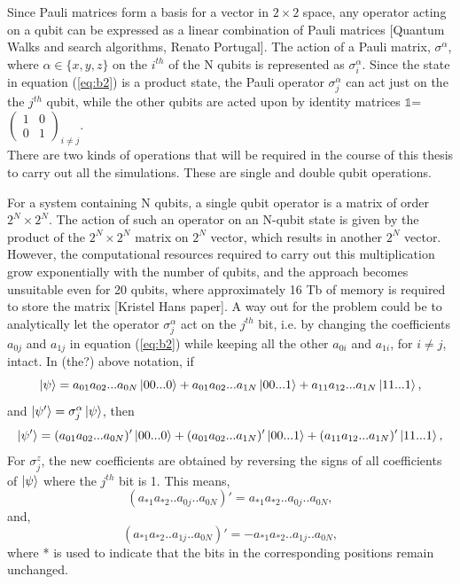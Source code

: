 \documentclass[12]{article}
\begin{document}
Since Pauli matrices form a basis for a vector in $2 \times 2$ space, any operator acting on a qubit can be expressed as a linear combination of Pauli matrices [Quantum Walks and search algorithms, Renato Portugal]. The action of a Pauli matrix, $\sigma^\alpha$, where $\alpha \in \{x,y,z\}$ on the $i^{th}$ of the N qubits is represented as $\sigma_i^\alpha$. Since the state in equation (\ref{eq:b2}) is a product state, the Pauli operator $\sigma_j^\alpha$ can act just on the the $j^{th}$ qubit, while the other qubits are acted upon by identity matrices $\mathbb{1}$=$\begin{pmatrix}
1&0\\
0&1
\end{pmatrix}_{i \neq j}
$.\\

There are two kinds of operations that will be required in the course of this thesis to carry out all the simulations. These are single and double qubit operations. 


For a system containing N qubits, a single qubit operator is a matrix of order $2^N \times 2^N$. The action of such an operator on an N-qubit state is given by the product of the $2^N \times 2^N$ matrix on $2^N$ vector, which results in another  $2^N$ vector. However, the computational resources required to carry out this multiplication grow exponentially with the number of qubits, and the approach becomes unsuitable even for 20 qubits, where approximately 16 Tb of memory is required to store the matrix [Kristel Hans paper]. A way out for the problem could be to analytically let the operator $\sigma_j^\alpha$ act on the $j^{th}$ bit, i.e. by changing the coefficients $a_{0j}$ and $a_{1j}$ in equation (\ref{eq:b2}) while keeping all the other $a_{0i}$ and $a_{1i}$, for $i \neq j$, intact. In (the?) above notation, if
\begin{equation}
\ket{\psi}= a_{01}a_{02}...a_{0N}\ket{00...0}+a_{01}a_{02}...a_{1N}\ket{00...1}+a_{11}a_{12}...a_{1N}\ket{11...1},
\end{equation}
and $\ket{\psi'}=\sigma_j^\alpha \ket{\psi}$, then
\begin{equation}
\ket{\psi'}= (a_{01}a_{02}...a_{0N})'\ket{00...0}+(a_{01}a_{02}...a_{1N})'\ket{00...1}+(a_{11}a_{12}...a_{1N})'\ket{11...1},
\end{equation}
For $\sigma_j^z$, the new coefficients are obtained by reversing the signs of all coefficients of $\ket{\psi}$ where the $j^{th}$ bit is 1. This means, 
\begin{equation}
(a_{*1}a_{*2}..a_{0j}..a_{0N})'=a_{*1}a_{*2}..a_{0j}..a_{0N},
\end{equation}
and,
\begin{equation}
(a_{*1}a_{*2}..a_{1j}..a_{0N})'=-a_{*1}a_{*2}..a_{1j}..a_{0N},
\end{equation}
where * is used to indicate that the bits in the corresponding positions remain unchanged.
\end{document}
